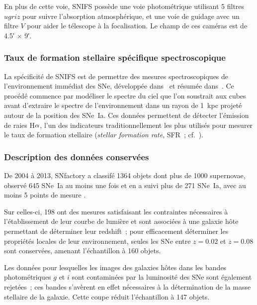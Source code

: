 \documentclass[../main/main.tex]{subfiles}
\begin{document}
En plus de cette voie, SNIFS possède une voie photométrique utilisant 5 filtres
$ugriz$ pour suivre l'absorption atmosphérique, et une voie de guidage avec un
filtre $V$ pour aider le télescope à la focalisation. Le champ de ces caméras
est de \ang{;4.5;} $\times$ \ang{;9;}.

\subsubsection{Taux de formation stellaire spécifique
spectroscopique}\label{sssec:snflssfr}

La spécificité de SNIFS est de permettre des mesures spectroscopiques de
l'environnement immédiat des SNe, développée dans~\cite{rigault2013} et résumée
dans~\cite{rigault2020}. Ce procédé commence par modéliser le spectre du ciel
que l'on soustrait aux cubes avant d'extraire le spectre de l'environnement dans
un rayon de \SI{1}{kpc} projeté autour de la position des SNe~Ia. Ces données
permettent de détecter l'émission de raies H$\alpha$, l'un des indicateurs
traditionnellement les plus utilisés pour mesurer le taux de formation stellaire
(\textit{stellar formation rate}, SFR~; cf.~\cite{kennicutt1998}).


\subsubsection{Description des données conservées}\label{sssec:snfdata}

De 2004 à 2013, SNfactory a classifé 1364 objets dont plus de 1000 supernovae,
observé 645 SNe~Ia au moins une fois et en a suivi plus de 271 SNe~Ia, avec au
moins 5 points de mesure \citep{copin2013}.

Sur celles-ci, 198 ont des mesures satisfaisant les contraintes nécessaires à
l'établissement de leur courbe de lumière et sont associées à une galaxie hôte
permettant de déterminer leur redshift~; pour efficacement déterminer les
propriétés locales de leur environnement, seules les SNe entre $z = 0.02$ et $z
= 0.08$ sont conservées, amenant l'échantillon à 160 objets.

Les données pour lesquelles les images des galaxies hôtes dans les bandes
photométriques $g$ et $i$ sont contaminées par la luminosité des SNe sont
également rejetées~; ces bandes s'avèrent en effet nécessaires à la
détermination de la masse stellaire de la galaxie. Cette coupe réduit
l'échantillon à 147 objets.
\end{document}
